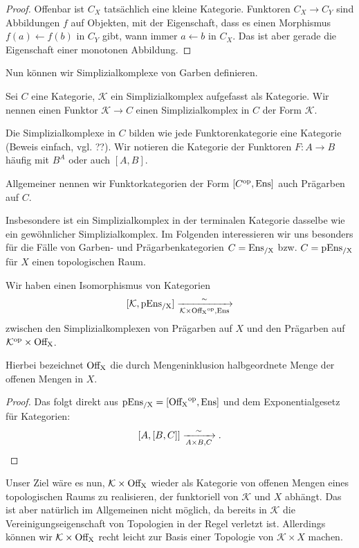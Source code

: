 \begin{proof}
  Offenbar ist $C_X$ tatsächlich eine kleine Kategorie. Funktoren $C_X
  \to C_Y$ sind Abbildungen $f$ auf Objekten, mit der Eigenschaft,
  dass es einen Morphismus $f(a) \leftarrow f(b)$ in $C_Y$ gibt, wann
  immer $a \leftarrow b$ in $C_X$. Das ist aber gerade die Eigenschaft
  einer monotonen Abbildung.
\end{proof}

Nun können wir Simplizialkomplexe von Garben definieren.

\begin{defn}
  Sei $C$ eine Kategorie, $\mathcal{K}$ ein Simplizialkomplex
  aufgefasst als Kategorie. Wir nennen einen Funktor $\mathcal{K} \to
  C$ einen Simplizialkomplex in $C$ der Form $\mathcal{K}$.
\end{defn}

Die Simplizialkomplexe in $C$ bilden wie jede Funktorenkategorie eine
Kategorie (Beweis einfach, vgl. ??). Wir notieren die Kategorie der
Funktoren $F: A \to B$ häufig mit $B^A$ oder auch $[A, B]$.

Allgemeiner nennen wir Funktorkategorien der Form $[C^\mathrm{op}, \operatorname{Ens}]$ auch
Prägarben auf $C$.

Insbesondere ist ein Simplizialkomplex in der terminalen Kategorie
dasselbe wie ein gewöhnlicher Simplizialkomplex. Im Folgenden
interessieren wir uns besonders für die Fälle von Garben- und
Prägarbenkategorien $C = \operatorname{Ens_{/X}}$ bzw. $C = \operatorname{pEns_{/X}}$ für $X$ einen
topologischen Raum.

\begin{lemma}
  Wir haben einen Isomorphismus von Kategorien
  \[
    [\mathcal{K}, \operatorname{pEns_{/X}}] \xrightarrow[\mathcal{K} \times \operatorname{Off_X}^\mathrm{op}, \operatorname{Ens}]{\sim}
  \]    
  zwischen den Simplizialkomplexen von Prägarben auf $X$ und den
  Prägarben auf $\mathcal{K}^\mathrm{op} \times \operatorname{Off_X}$.
\end{lemma}

Hierbei bezeichnet $\operatorname{Off_X}$ die durch Mengeninklusion halbgeordnete
Menge der offenen Mengen in $X$.

\begin{proof}
  Das folgt direkt aus $\operatorname{pEns_{/X}} = [\operatorname{Off_X}^\mathrm{op}, \operatorname{Ens}]$ und dem
  Exponentialgesetz für Kategorien:
  \[ [A, [B, C]] \xrightarrow[A \times B, C]{\sim}. \]
\end{proof}

Unser Ziel wäre es nun, $\mathcal{K} \times \operatorname{Off_X}$ wieder als
Kategorie von offenen Mengen eines topologischen Raums zu realisieren,
der funktoriell von $\mathcal{K}$ und $X$ abhängt. Das ist aber
natürlich im Allgemeinen nicht möglich, da bereits in $\mathcal{K}$
die Vereinigungseigenschaft von Topologien in der Regel verletzt
ist. Allerdings können wir $\mathcal{K} \times \operatorname{Off_X}$ recht leicht zur
Basis einer Topologie von $\mathcal{K} \times X$ machen.

